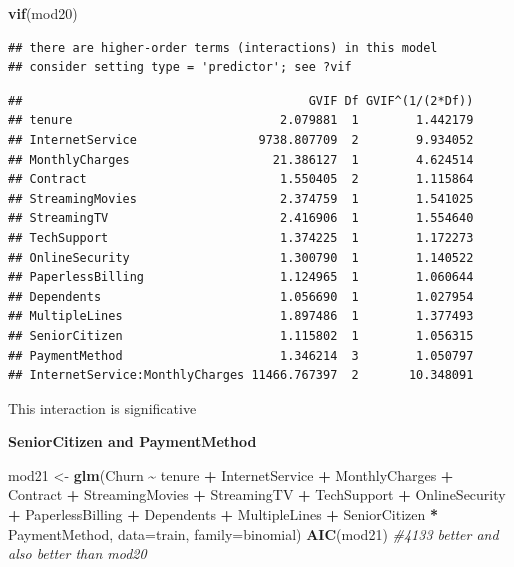 \documentclass[
  twoside]{article}
\newenvironment{Shaded}{\begin{snugshade}}{\end{snugshade}}
\newcommand{\AttributeTok}[1]{\textcolor[rgb]{0.13,0.29,0.53}{#1}}
\newcommand{\CommentTok}[1]{\textcolor[rgb]{0.56,0.35,0.01}{\textit{#1}}}
\newcommand{\FunctionTok}[1]{\textcolor[rgb]{0.13,0.29,0.53}{\textbf{#1}}}
\newcommand{\NormalTok}[1]{#1}
\newcommand{\OtherTok}[1]{\textcolor[rgb]{0.56,0.35,0.01}{#1}}
\newcommand{\SpecialCharTok}[1]{\textcolor[rgb]{0.81,0.36,0.00}{\textbf{#1}}}
\begin{document}
\begin{Shaded}
\begin{Highlighting}[]
\FunctionTok{vif}\NormalTok{(mod20)}
\end{Highlighting}
\end{Shaded}

\begin{verbatim}
## there are higher-order terms (interactions) in this model
## consider setting type = 'predictor'; see ?vif
\end{verbatim}

\begin{verbatim}
##                                        GVIF Df GVIF^(1/(2*Df))
## tenure                             2.079881  1        1.442179
## InternetService                 9738.807709  2        9.934052
## MonthlyCharges                    21.386127  1        4.624514
## Contract                           1.550405  2        1.115864
## StreamingMovies                    2.374759  1        1.541025
## StreamingTV                        2.416906  1        1.554640
## TechSupport                        1.374225  1        1.172273
## OnlineSecurity                     1.300790  1        1.140522
## PaperlessBilling                   1.124965  1        1.060644
## Dependents                         1.056690  1        1.027954
## MultipleLines                      1.897486  1        1.377493
## SeniorCitizen                      1.115802  1        1.056315
## PaymentMethod                      1.346214  3        1.050797
## InternetService:MonthlyCharges 11466.767397  2       10.348091
\end{verbatim}

This interaction is significative

\textbf{SeniorCitizen and PaymentMethod}

\begin{Shaded}
\begin{Highlighting}[]
\NormalTok{mod21 }\OtherTok{\textless{}{-}} \FunctionTok{glm}\NormalTok{(Churn }\SpecialCharTok{\textasciitilde{}}\NormalTok{ tenure }\SpecialCharTok{+}\NormalTok{ InternetService }\SpecialCharTok{+}\NormalTok{ MonthlyCharges }\SpecialCharTok{+}\NormalTok{ Contract }\SpecialCharTok{+}\NormalTok{ StreamingMovies }\SpecialCharTok{+}\NormalTok{ StreamingTV }\SpecialCharTok{+}\NormalTok{ TechSupport }\SpecialCharTok{+}\NormalTok{ OnlineSecurity }\SpecialCharTok{+}\NormalTok{ PaperlessBilling }\SpecialCharTok{+}\NormalTok{ Dependents }\SpecialCharTok{+}\NormalTok{ MultipleLines }\SpecialCharTok{+}\NormalTok{ SeniorCitizen }\SpecialCharTok{*}\NormalTok{ PaymentMethod, }\AttributeTok{data=}\NormalTok{train, }\AttributeTok{family=}\NormalTok{binomial)}
\FunctionTok{AIC}\NormalTok{(mod21) }\CommentTok{\#4133 better and also better than mod20}
\end{Highlighting}
\end{Shaded}
\end{document}
